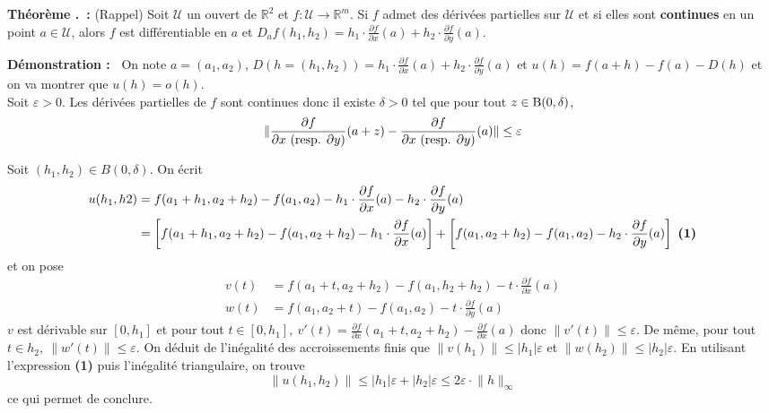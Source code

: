 \documentclass[5pt,a4paper]{article}
\newcounter{thmcounter}[subsection]
\renewcommand{\thethmcounter}{\thesubsection.\arabic{thmcounter}}
\newcommand{\thm}[1]{
    \stepcounter{thmcounter}
    \hypertarget{t:\thethmcounter}{}%
    \noindent\textbf{Théorème \thethmcounter ~:} #1 \newline
}
\newcommand{\demo}[1]{
    \textbf{Démonstration :~} #1 \newline
}
\begin{document}
\begin{onehalfspacing}
\thm{(Rappel) Soit $\mathcal{U}$ un ouvert de $\mathbb{R}^2$ et $f : \mathcal{U} \rightarrow \mathbb{R}^m$. Si $f$ admet des dérivées partielles sur $\mathcal{U}$ et si elles sont \textbf{continues} en un point $a \in \mathcal{U}$, alors $f$ est différentiable en $a$ et $D_af (h_1, h_2) = h_1 \cdot \frac{\partial f}{\partial x}(a) + h_2 \cdot \frac{\partial f}{\partial y}(a)$.}
\demo{On note $a = (a_1, a_2)$, $D(h = (h_1, h_2)) = h_1 \cdot \frac{\partial f}{\partial x}(a) + h_2 \cdot \frac{\partial f}{\partial y}(a)$ et $u(h) = f(a + h) - f(a) - D(h)$ et on va montrer que $u(h) = o(h)$. \\
Soit $\varepsilon > 0$. Les dérivées partielles de $f$ sont continues donc il existe $\delta > 0$ tel que pour tout $z \in \textup{B}(0, \delta)$,
\[ \lVert \frac{\partial f}{\partial x~ (\textup{resp. }\partial y)}(a + z) - \frac{\partial f}{\partial x~ (\textup{resp. }\partial y)}(a)\rVert \leq \varepsilon \]

Soit $(h_1, h_2) \in B(0, \delta)$. On écrit
\begin{align*}
    u(h_1, h2) &= f(a_1 +h_1, a_2 + h_2) - f(a_1, a_2) - h_1 \cdot \frac{\partial f}{\partial x}(a) - h_2 \cdot \frac{\partial f}{\partial y}(a) \\
    &= \left[ f(a_1 + h_1, a_2 + h_2) - f(a_1, a_2 + h_2) - h_1 \cdot \frac{\partial f}{\partial x}(a) \right]
    + \left[ f(a_1, a_2 + h_2) - f(a_1, a_2) - h_2 \cdot \frac{\partial f}{\partial y}(a) \right] ~\textup{\textbf{(1)}}
\end{align*}
et on pose 
\begin{align*}
    v(t) &= f(a_1 + t, a_2 + h_2) - f(a_1, h_2 + h_2) - t \cdot \frac{\partial f}{\partial x}(a) \\
    w(t) &= f(a_1, a_2 + t) - f(a_1, a_2) - t \cdot \frac{\partial f}{\partial y}(a)
\end{align*}
$v$ est dérivable sur $[0, h_1]$ et pour tout $t \in [0, h_1],~ v'(t) = \frac{\partial f}{\partial x}(a_1 + t, a_2 + h_2) - \frac{\partial f}{\partial x}(a)$ donc $\lVert v'(t) \rVert \leq \varepsilon$. De même, pour tout $t \in h_2,~ \lVert w'(t) \rVert \leq \varepsilon$. On déduit de l'inégalité des accroissements finis que $\lVert v(h_1) \rVert \leq |h_1|\varepsilon$ et $\lVert w(h_2) \rVert \leq |h_2|\varepsilon$. En utilisant l'expression \textbf{(1)} puis l'inégalité triangulaire, on trouve 
\[ \lVert u(h_1, h_2) \rVert \leq |h_1|\varepsilon + |h_2|\varepsilon \leq 2\varepsilon \cdot \lVert h \rVert_{\infty} \]
ce qui permet de conclure.  
}


\end{onehalfspacing}
\end{document}
